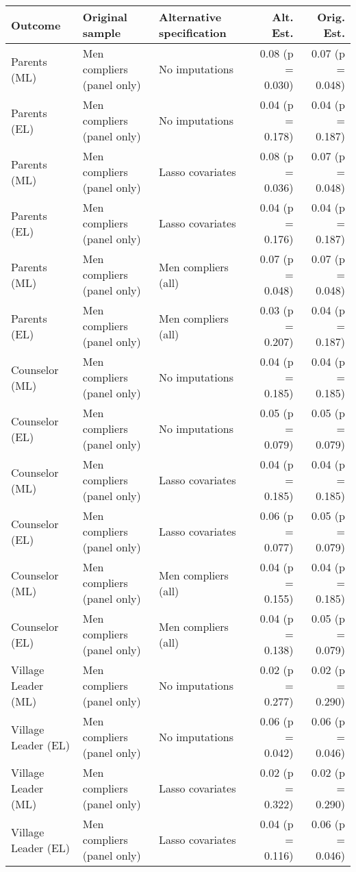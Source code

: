 \begin{tabular}{lllrr}
  \hline
Outcome & Original sample & Alternative specification & Alt. Est. & Orig. Est. \\ 
  \hline
 Parents (ML) & Men compliers (panel only) & No imputations & 0.08 (p = 0.030) & 0.07 (p = 0.048) \\ 
   Parents (EL) & Men compliers (panel only) & No imputations & 0.04 (p = 0.178) & 0.04 (p = 0.187) \\ 
   Parents (ML) & Men compliers (panel only) & Lasso covariates & 0.08 (p = 0.036) & 0.07 (p = 0.048) \\ 
   Parents (EL) & Men compliers (panel only) & Lasso covariates & 0.04 (p = 0.176) & 0.04 (p = 0.187) \\ 
   Parents (ML) & Men compliers (panel only) & Men compliers (all) & 0.07 (p = 0.048) & 0.07 (p = 0.048) \\ 
   Parents (EL) & Men compliers (panel only) & Men compliers (all) & 0.03 (p = 0.207) & 0.04 (p = 0.187) \\ 
   Counselor (ML) & Men compliers (panel only) & No imputations & 0.04 (p = 0.185) & 0.04 (p = 0.185) \\ 
   Counselor (EL) & Men compliers (panel only) & No imputations & 0.05 (p = 0.079) & 0.05 (p = 0.079) \\ 
   Counselor (ML) & Men compliers (panel only) & Lasso covariates & 0.04 (p = 0.185) & 0.04 (p = 0.185) \\ 
   Counselor (EL) & Men compliers (panel only) & Lasso covariates & 0.06 (p = 0.077) & 0.05 (p = 0.079) \\ 
   Counselor (ML) & Men compliers (panel only) & Men compliers (all) & 0.04 (p = 0.155) & 0.04 (p = 0.185) \\ 
   Counselor (EL) & Men compliers (panel only) & Men compliers (all) & 0.04 (p = 0.138) & 0.05 (p = 0.079) \\ 
   Village Leader (ML) & Men compliers (panel only) & No imputations & 0.02 (p = 0.277) & 0.02 (p = 0.290) \\ 
   Village Leader (EL) & Men compliers (panel only) & No imputations & 0.06 (p = 0.042) & 0.06 (p = 0.046) \\ 
   Village Leader (ML) & Men compliers (panel only) & Lasso covariates & 0.02 (p = 0.322) & 0.02 (p = 0.290) \\ 
   Village Leader (EL) & Men compliers (panel only) & Lasso covariates & 0.04 (p = 0.116) & 0.06 (p = 0.046) \\ 

\end{tabular}
